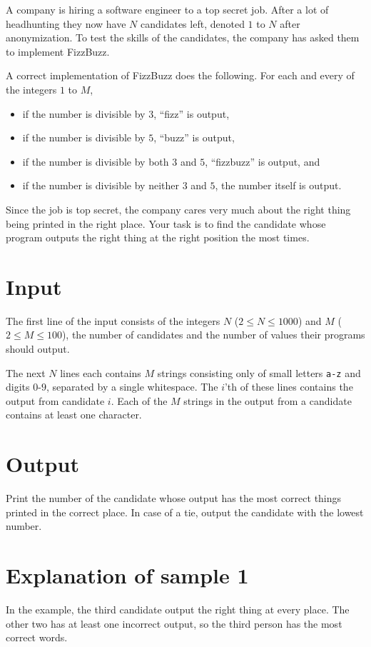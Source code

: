 A company is hiring a software engineer to a top secret job.
After a lot of headhunting they now have $N$ candidates left, denoted $1$ to $N$ after anonymization.
To test the skills of the candidates, the company has asked them to implement FizzBuzz.

A correct implementation of FizzBuzz does the following.
For each and every of the integers $1$ to $M$,
\begin{itemize}
  \item if the number is divisible by $3$, ``fizz'' is output,
  \item if the number is divisible by $5$, ``buzz'' is output,
  \item if the number is divisible by both $3$ and $5$, ``fizzbuzz'' is output, and
  \item if the number is divisible by neither $3$ and $5$, the number itself is output.
\end{itemize}

Since the job is top secret, the company cares very much about the right thing being printed in the right place.
Your task is to find the candidate whose program outputs the right thing at the right position the most times.

\section*{Input}
The first line of the input consists of the integers $N$ ($2 \leq N \leq 1000$) and $M$ ($2 \leq M \leq 100$), the number of candidates and the number of values their programs should output.

The next $N$ lines each contains $M$ strings consisting only of small letters \texttt{a-z} and digits $0$-$9$, separated by a single whitespace.
The $i$'th of these lines contains the output from candidate $i$.
Each of the $M$ strings in the output from a candidate contains at least one character.

\section*{Output}
Print the number of the candidate whose output has the most correct things printed in the correct place.
In case of a tie, output the candidate with the lowest number.

\section*{Explanation of sample 1}
In the example, the third candidate output the right thing at every place.
The other two has at least one incorrect output, so the third person has the most correct words.
